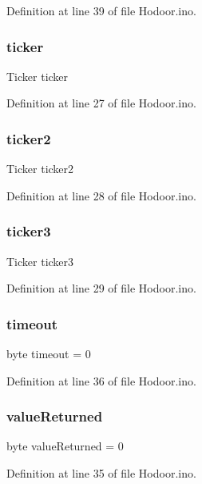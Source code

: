 Definition at line 39 of file Hodoor.\+ino.

\mbox{\label{_hodoor_8ino_a4bb2542b2738619fdf76b685b10e315d}} 
\subsubsection{\texorpdfstring{ticker}{ticker}}
{\footnotesize\ttfamily Ticker ticker}



Definition at line 27 of file Hodoor.\+ino.

\mbox{\label{_hodoor_8ino_ac897bdb69e388d25c44452966489a9c0}} 
\subsubsection{\texorpdfstring{ticker2}{ticker2}}
{\footnotesize\ttfamily Ticker ticker2}



Definition at line 28 of file Hodoor.\+ino.

\mbox{\label{_hodoor_8ino_ac954b19255c9b0503807c1487a6b37e8}} 
\subsubsection{\texorpdfstring{ticker3}{ticker3}}
{\footnotesize\ttfamily Ticker ticker3}



Definition at line 29 of file Hodoor.\+ino.

\mbox{\label{_hodoor_8ino_a190531d86dfe4b60f4a36c36dccc7399}} 
\subsubsection{\texorpdfstring{timeout}{timeout}}
{\footnotesize\ttfamily byte timeout = 0}



Definition at line 36 of file Hodoor.\+ino.

\mbox{\label{_hodoor_8ino_ac22a0d46d5b9a804560f46b8a3e219d0}} 
\subsubsection{\texorpdfstring{value\+Returned}{valueReturned}}
{\footnotesize\ttfamily byte value\+Returned = 0}



Definition at line 35 of file Hodoor.\+ino.

